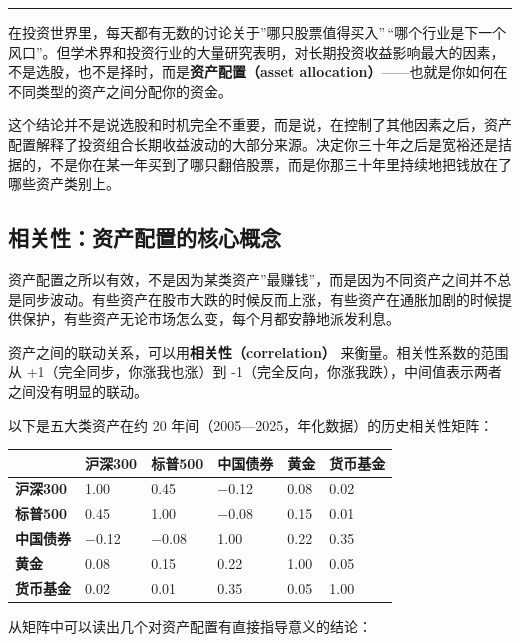 \documentclass[a4paper,11pt,oneside,fontset=none,UTF8,zihao=-4]{ctexbook}
\begin{document}
\begin{center}{\color{dh-bronze}\rule{0.2\textwidth}{0.5pt}}\end{center}

在投资世界里，每天都有无数的讨论关于''哪只股票值得买入''\,``哪个行业是下一个风口''。但学术界和投资行业的大量研究表明，对长期投资收益影响最大的因素，不是选股，也不是择时，而是\textbf{资产配置（asset
allocation）}------也就是你如何在不同类型的资产之间分配你的资金。

这个结论并不是说选股和时机完全不重要，而是说，在控制了其他因素之后，资产配置解释了投资组合长期收益波动的大部分来源。决定你三十年之后是宽裕还是拮据的，不是你在某一年买到了哪只翻倍股票，而是你那三十年里持续地把钱放在了哪些资产类别上。

\subsection{相关性：资产配置的核心概念}\label{ux76f8ux5173ux6027ux8d44ux4ea7ux914dux7f6eux7684ux6838ux5fc3ux6982ux5ff5}

资产配置之所以有效，不是因为某类资产''最赚钱''，而是因为不同资产之间并不总是同步波动。有些资产在股市大跌的时候反而上涨，有些资产在通胀加剧的时候提供保护，有些资产无论市场怎么变，每个月都安静地派发利息。

资产之间的联动关系，可以用\textbf{相关性（correlation）}
来衡量。相关性系数的范围从 +1（完全同步，你涨我也涨）到
-1（完全反向，你涨我跌），中间值表示两者之间没有明显的联动。

以下是五大类资产在约 20 年间（2005---2025，年化数据）的历史相关性矩阵：

\begin{longtable}[]{@{}llllll@{}}
\toprule\noalign{}\rowcolor{dh-pink!25}
& 沪深300 & 标普500 & 中国债券 & 黄金 & 货币基金 \\
\midrule\noalign{}
\endhead
\bottomrule\noalign{}
\endlastfoot
\textbf{沪深300} & 1.00 & 0.45 & −0.12 & 0.08 & 0.02 \\
\textbf{标普500} & 0.45 & 1.00 & −0.08 & 0.15 & 0.01 \\
\textbf{中国债券} & −0.12 & −0.08 & 1.00 & 0.22 & 0.35 \\
\textbf{黄金} & 0.08 & 0.15 & 0.22 & 1.00 & 0.05 \\
\textbf{货币基金} & 0.02 & 0.01 & 0.35 & 0.05 & 1.00 \\
\end{longtable}

从矩阵中可以读出几个对资产配置有直接指导意义的结论：
\end{document}
